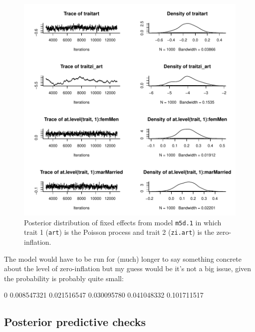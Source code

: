 \documentclass{article}
\begin{document}
\begin{figure}[!h]
\begin{center}
\includegraphics{Lecture5-039}
\end{center}
\caption{Posterior distribution of fixed effects from model \texttt{m5d.1} in which trait 1 (\texttt{art}) is the Poisson process and trait 2 (\texttt{zi.art}) is the zero-inflation.}
\label{ZIP}
\end{figure}

The model would have to be run for (much) longer to say something concrete about the level of zero-inflation but my guess would be it's not a big issue, given the probability is probably quite small:

\begin{Schunk}
\begin{Soutput}
         0%
0.008547321 0.021516547 0.030095780 0.041048332 0.101711517 
\end{Soutput}
\end{Schunk}

\subsection{Posterior predictive checks}
\end{document}

